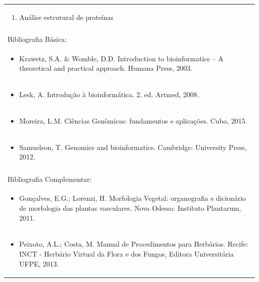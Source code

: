 \documentclass[11pt]{article}
\begin{document}
\begin{center}
\begin{longtable}{|p{4cm}|p{4cm}|p{4cm}|p{4cm}|}
\multicolumn{4}{|p{\dimexpr 16cm + 6\tabcolsep\relax}|}{\begin{enumerate}[start=8]\item Análise estrutural de proteínas\end{enumerate}}\\
\multicolumn{4}{|p{\dimexpr 16cm + 6\tabcolsep\relax}|}{}\\
\hline
\multicolumn{4}{|p{16cm}|}{Bibliografia Básica:}\\*
\multicolumn{4}{|p{\dimexpr 16cm + 6\tabcolsep\relax}|}{\begin{itemize}\item Krawetz, S.A. \& Womble, D.D. Introduction to bioinformatics – A theoretical and practical approach. Humana Press, 2003.\end{itemize}}\\
\multicolumn{4}{|p{\dimexpr 16cm + 6\tabcolsep\relax}|}{\begin{itemize}\item Lesk, A. Introdução à bioinformática. 2. ed. Artmed, 2008.\end{itemize}}\\
\multicolumn{4}{|p{\dimexpr 16cm + 6\tabcolsep\relax}|}{\begin{itemize}\item Moreira, L.M. Ciências Genômicas: fundamentos e aplicações. Cubo, 2015.\end{itemize}}\\
\multicolumn{4}{|p{\dimexpr 16cm + 6\tabcolsep\relax}|}{\begin{itemize}\item Samuelson, T. Genomics and bioinformatics. Cambridge: University Press, 2012.\end{itemize}}\\
\multicolumn{4}{|p{16cm}|}{}\\
\hline
\multicolumn{4}{|p{16cm}|}{Bibliografia Complementar:}\\*
\multicolumn{4}{|p{\dimexpr 16cm + 6\tabcolsep\relax}|}{\begin{itemize}\item Gonçalves, E.G.; Lorenzi, H. Morfologia Vegetal: organografia e dicionário de morfologia das plantas vasculares. Nova Odessa: Instituto Plantarum, 2011.\end{itemize}}\\
\multicolumn{4}{|p{\dimexpr 16cm + 6\tabcolsep\relax}|}{\begin{itemize}\item Peixoto, A.L.; Costa, M. Manual de Procedimentos para Herbários. Recife: INCT - Herbário Virtual da Flora e dos Fungos, Editora Universitária UFPE, 2013.\end{itemize}}\\
\hline
\end{longtable}
\end{center}
\end{document}
